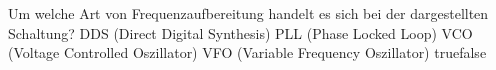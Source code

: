     {Um welche Art von Frequenzaufbereitung handelt es sich bei der dargestellten Schaltung?}
    {DDS (Direct Digital Synthesis)}
    {PLL (Phase Locked Loop)}
    {VCO (Voltage Controlled Oszillator)}
    {VFO (Variable Frequency Oszillator)}
    {true}{false}